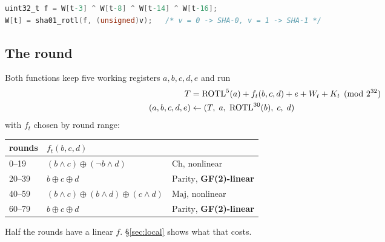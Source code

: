 \documentclass[11pt,a4paper]{article}
\newcommand{\rotl}{\ensuremath{\mathrm{ROTL}}}
\begin{document}
\begin{lstlisting}[language=C]
uint32_t f = W[t-3] ^ W[t-8] ^ W[t-14] ^ W[t-16];
W[t] = sha01_rotl(f, (unsigned)v);   /* v = 0 -> SHA-0, v = 1 -> SHA-1 */
\end{lstlisting}

\subsection{The round}\label{sec:round}

Both functions keep five working registers $a,b,c,d,e$ and run
%
\begin{align}
  T   &= \rotl^{5}(a) + f_t(b,c,d) + e + W_t + K_t \pmod{2^{32}} \label{eq:round}\\
  (a,b,c,d,e) &\leftarrow (T,\; a,\; \rotl^{30}(b),\; c,\; d) \notag
\end{align}
%
with $f_t$ chosen by round range:
%
\begin{center}
\begin{tabular}{lll}
\toprule
rounds & $f_t(b,c,d)$ & \\
\midrule
0--19  & $(b \wedge c) \oplus (\lnot b \wedge d)$ & $\mathrm{Ch}$, nonlinear\\
20--39 & $b \oplus c \oplus d$ & $\mathrm{Parity}$, \textbf{GF(2)-linear}\\
40--59 & $(b\wedge c)\oplus(b\wedge d)\oplus(c\wedge d)$ & $\mathrm{Maj}$, nonlinear\\
60--79 & $b \oplus c \oplus d$ & $\mathrm{Parity}$, \textbf{GF(2)-linear}\\
\bottomrule
\end{tabular}
\end{center}
%
Half the rounds have a linear $f$. \S\ref{sec:local} shows what that costs.
\end{document}
